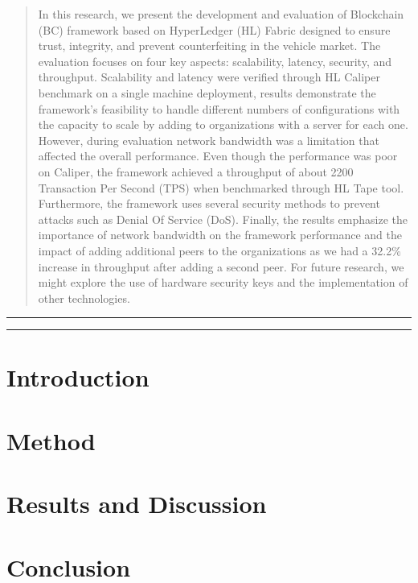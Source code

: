 \documentclass{iaesarticle}
\begin{document}
\parbox[t][][s]{0.65\textwidth}{%
\begin{abstract}
\vspace{.3em}
In this research, we present the development and evaluation of Blockchain (BC) framework based on HyperLedger (HL) Fabric designed to ensure trust, integrity, and prevent counterfeiting in the vehicle market. The evaluation focuses on four key aspects: scalability, latency, security, and throughput. Scalability and latency were verified through HL Caliper benchmark on a single machine deployment, results demonstrate the framework’s feasibility to handle different numbers of configurations with the capacity to scale by adding to organizations with a server for each one. However, during evaluation network bandwidth was a limitation that affected the overall performance. Even though the performance was poor on Caliper, the framework achieved a throughput of about 2200 Transaction Per Second (TPS) when benchmarked through HL Tape tool. Furthermore, the framework uses several security methods to prevent attacks such as Denial Of Service (DoS). Finally, the results emphasize the importance of network bandwidth on the framework performance and the impact of adding additional peers to the organizations as we had a 32.2\% increase in throughput after adding a second peer. For future research, we might explore the use of hardware security keys and the implementation of other technologies.
\end{abstract}
}

\vspace{.5em}
\hrule
\vspace{.1em}
\hrule



\section{Introduction}

\section{Method}


\section{Results and Discussion}


\section{Conclusion}


\printbibliography[heading=bibintoc]
\end{document}
